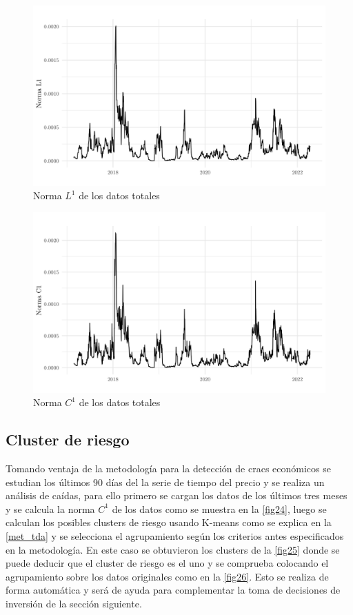 \begin{figure}
	\centering
	\includegraphics[scale=0.3]{Chapter5/norm_l1.png}
	\caption{Norma $L^1$ de los datos totales}
	\label{fig22}
\end{figure}

\begin{figure}
	\centering
	\includegraphics[scale=0.3]{Chapter5/norm_c1.png}
	\caption{Norma $C^1$ de los datos totales}
	\label{fig23}
\end{figure}

\subsection{Cluster de riesgo}

Tomando ventaja de la metodología para la detección de cracs económicos se estudian los últimos 90 días del la serie de tiempo del precio y se realiza un análisis de caídas, para ello primero se cargan los datos de los últimos tres meses y se calcula la norma $C^1$ de los datos como se muestra en la \autoref{fig24}, luego se calculan los posibles clusters de riesgo usando K-means como se explica en la \autoref{met_tda} y se selecciona el agrupamiento según los criterios antes especificados en la metodología. En este caso se obtuvieron los clusters de la \autoref{fig25} donde se puede deducir que el cluster de riesgo es el uno y se comprueba colocando el agrupamiento sobre los datos originales como en la \autoref{fig26}. Esto se realiza de forma automática y será de ayuda para complementar la toma de decisiones de inversión de la sección siguiente.

